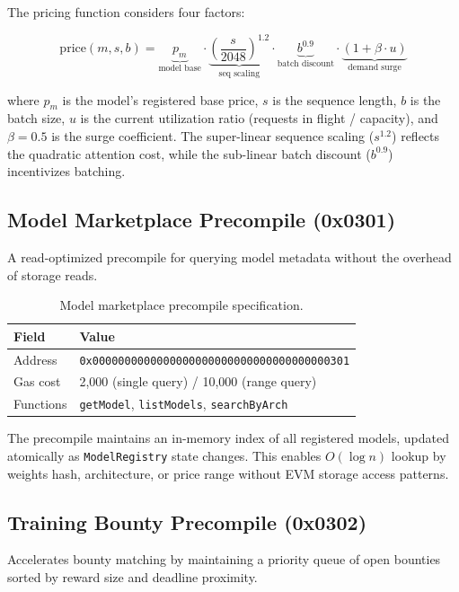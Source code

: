 \documentclass[11pt,letterpaper]{article}
\begin{document}
The pricing function considers four factors:

\begin{equation}
\text{price}(m, s, b) = \underbrace{p_m}_{\text{model base}} \cdot \underbrace{\left(\frac{s}{2048}\right)^{1.2}}_{\text{seq scaling}} \cdot \underbrace{b^{0.9}}_{\text{batch discount}} \cdot \underbrace{(1 + \beta \cdot u)}_{\text{demand surge}}
\end{equation}

where $p_m$ is the model's registered base price, $s$ is the sequence length, $b$ is the batch size, $u$ is the current utilization ratio (requests in flight / capacity), and $\beta = 0.5$ is the surge coefficient. The super-linear sequence scaling ($s^{1.2}$) reflects the quadratic attention cost, while the sub-linear batch discount ($b^{0.9}$) incentivizes batching.

\subsection{Model Marketplace Precompile (0x0301)}

A read-optimized precompile for querying model metadata without the overhead of storage reads.

\begin{table}[h]
\centering
\caption{Model marketplace precompile specification.}
\label{tab:precompile-0301}
\begin{tabular}{@{}ll@{}}
\toprule
Field & Value \\
\midrule
Address & \texttt{0x0000000000000000000000000000000000000301} \\
Gas cost & 2,000 (single query) / 10,000 (range query) \\
Functions & \texttt{getModel}, \texttt{listModels}, \texttt{searchByArch} \\
\bottomrule
\end{tabular}
\end{table}

The precompile maintains an in-memory index of all registered models, updated atomically as \texttt{ModelRegistry} state changes. This enables $O(\log n)$ lookup by weights hash, architecture, or price range without EVM storage access patterns.

\subsection{Training Bounty Precompile (0x0302)}

Accelerates bounty matching by maintaining a priority queue of open bounties sorted by reward size and deadline proximity.
\end{document}

